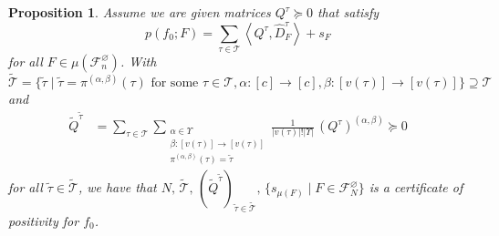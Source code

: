 \documentclass[a4paper,11pt]{article}
\newtheorem{proposition}[theorem]{Proposition}
\numberwithin{equation}{section}
\newcommand{\mF}{\mathcal{F}}
\newcommand{\mT}{\mathcal{T}}
\begin{document}
\begin{proposition}\label{lem:one_direction_of_equiv}
    Assume we are given matrices $Q^\tau\succeq 0$ that satisfy
    \begin{equation} \label{eq:reduced-sdp-0}
        p(f_0; F) = \sum_{\tau \in \mT}\left\langle Q^{\tau}, \hat{D}_{F }^{\tau } \right\rangle + s_{ F }
    \end{equation}
    for all $F \in \mu(\mF_n^\varnothing)$. With
    \begin{equation*}
        \tilde{\mT} = \{ \tilde \tau \mid \tilde{\tau} = \pi^{(\alpha,\beta)}(\tau) \text{ for some } \tau\in\mT, \alpha:[c]\to [c], \beta:[v(\tau)]\to [v(\tau)] \} \supseteq \mT
    \end{equation*}
    and
    \begin{align*}
        \tilde Q^{\tilde \tau} &= \sum_{\tau\in \mT} \sum_{\substack{\alpha\in\Upsilon \\ \beta:[v(\tau)]\to [v(\tau)] \\ \pi^{(\alpha,\beta)}(\tau) = \tilde\tau}} 
        \frac{1}{|v(\tau)|!|\Upsilon|}  \, (Q^{\tau})^{(\alpha,\beta)} \succeq 0
    \end{align*}
    for all $\tilde{\tau} \in \tilde{\mT}$, we have that $N, \, \tilde{\mT}, \, (\tilde{Q}^{\tilde{\tau}} )_{\tilde {\tau} \in \tilde{\mT}}, \, \{ s_{\mu(F)} \mid F \in \mF_N^\varnothing \}$ is a certificate of positivity for $f_0$.
\end{proposition}
%
\end{document}
